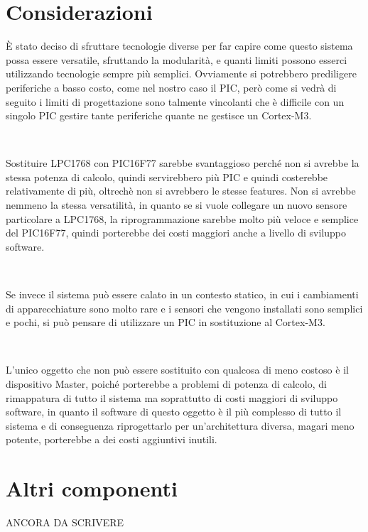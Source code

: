 \documentclass[a4paper,titlepage]{book}
\begin{document}
\section{Considerazioni}

È stato deciso di sfruttare tecnologie diverse per far capire come questo sistema possa essere versatile, sfruttando la modularità, e quanti limiti possono esserci utilizzando tecnologie sempre più semplici. Ovviamente si potrebbero prediligere periferiche a basso costo, come nel nostro caso il PIC, però come si vedrà di seguito i limiti di progettazione sono talmente vincolanti che è difficile con un singolo PIC gestire tante periferiche quante ne gestisce un Cortex-M3.

~

Sostituire LPC1768 con PIC16F77 sarebbe svantaggioso perché non si avrebbe la stessa potenza di calcolo, quindi servirebbero più PIC e quindi costerebbe relativamente di più, oltrechè non si avrebbero le stesse features. Non si avrebbe nemmeno la stessa versatilità, in quanto se si vuole collegare un nuovo sensore particolare a LPC1768, la riprogrammazione sarebbe molto più veloce e semplice del PIC16F77, quindi porterebbe dei costi maggiori anche a livello di sviluppo software.

~

Se invece il sistema può essere calato in un contesto statico, in cui i cambiamenti di apparecchiature sono molto rare e i sensori che vengono installati sono semplici e pochi, si può pensare di utilizzare un PIC in sostituzione al Cortex-M3.

~

L'unico oggetto che non può essere sostituito con qualcosa di meno costoso è il dispositivo Master, poiché porterebbe a problemi di potenza di calcolo, di rimappatura di tutto il sistema ma soprattutto di costi maggiori di sviluppo software, in quanto il software di questo oggetto è il più complesso di tutto il sistema e di conseguenza riprogettarlo per un'architettura diversa, magari meno potente, porterebbe a dei costi aggiuntivi inutili. 


\section{Altri componenti}

ANCORA DA SCRIVERE

\end{document}
